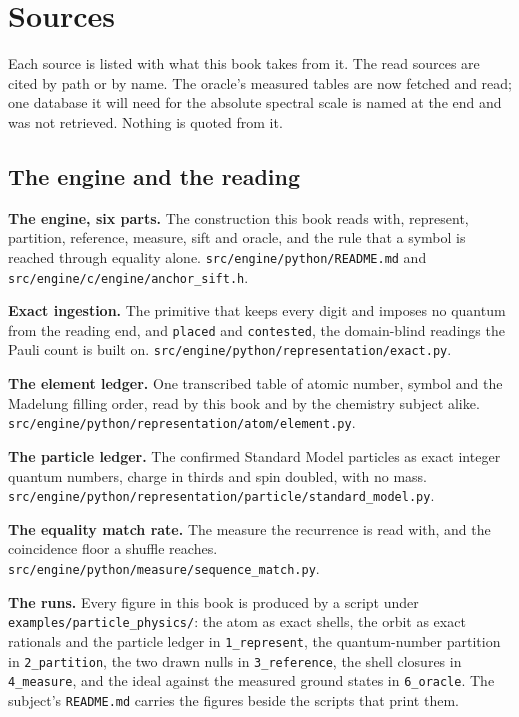 \chapter{Sources}

Each source is listed with what this book takes from it. The read sources are cited by path or by name.
The oracle's measured tables are now fetched and read; one database it will need for the absolute
spectral scale is named at the end and was not retrieved. Nothing is quoted from it.

\section*{The engine and the reading}

\textbf{The engine, six parts.} The construction this book reads with, represent, partition,
reference, measure, sift and oracle, and the rule that a symbol is reached through equality alone.
\texttt{src/\allowbreak{}engine/\allowbreak{}python/\allowbreak{}README.md} and
\texttt{src/\allowbreak{}engine/\allowbreak{}c/\allowbreak{}engine/\allowbreak{}anchor\_sift.h}.

\textbf{Exact ingestion.} The primitive that keeps every digit and imposes no quantum from the reading
end, and \texttt{placed} and \texttt{contested}, the domain-blind readings the Pauli count is built
on. \texttt{src/\allowbreak{}engine/\allowbreak{}python/\allowbreak{}representation/\allowbreak{}exact.py}.

\textbf{The element ledger.} One transcribed table of atomic number, symbol and the Madelung filling
order, read by this book and by the chemistry subject alike.
\texttt{src/\allowbreak{}engine/\allowbreak{}python/\allowbreak{}representation/\allowbreak{}atom/\allowbreak{}element.py}.

\textbf{The particle ledger.} The confirmed Standard Model particles as exact integer quantum numbers,
charge in thirds and spin doubled, with no mass.
\texttt{src/\allowbreak{}engine/\allowbreak{}python/\allowbreak{}representation/\allowbreak{}particle/\allowbreak{}standard\_model.py}.

\textbf{The equality match rate.} The measure the recurrence is read with, and the coincidence floor a
shuffle reaches.
\texttt{src/\allowbreak{}engine/\allowbreak{}python/\allowbreak{}measure/\allowbreak{}sequence\_match.py}.

\textbf{The runs.} Every figure in this book is produced by a script under
\texttt{examples/\allowbreak{}particle\_physics/}: the atom as exact shells, the orbit as exact
rationals and the particle ledger in \texttt{1\_represent}, the quantum-number partition in
\texttt{2\_partition}, the two drawn nulls in \texttt{3\_reference}, the shell closures in
\texttt{4\_measure}, and the ideal against the measured ground states in \texttt{6\_oracle}. The
subject's \texttt{README.md} carries the figures beside the scripts that print them.

